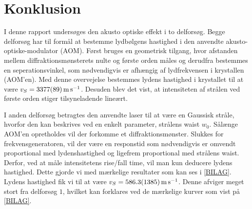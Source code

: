 \documentclass[main]{subfiles}
\begin{document}
\section{Konklusion}
I denne rapport undersøges den akusto optiske effekt i to delforsøg. Begge delforsøg har til formål at bestemme lydbølgens hastighed i den anvendte akusto-optiske-modulator (AOM). Først bruges en geometrisk tilgang, hvor afstanden mellem diffraktionsmønsterets nulte og første orden måles og derudfra bestemmes en seperationsvinkel, som nødvendigvis er afhængig af lydfrekvensen i krystallen (AOM'en). Med denne overvejelse bestemmes lydens hastighed i krystallet til at være $v_S=\SI{3377\pm89}{\meter\per\second}$.
Desuden blev det vist, at intensiteten af strålen ved første orden stiger tilsyneladende lineært.

I anden delforsøg betragtes den anvendte laser til at være en Gaussisk stråle, hvorfor den kan beskrives ved en enkelt parameter, strålens waist $w_0$. Sålænge AOM'en opretholdes vil der forkomme et diffraktionsmønster. Slukkes for frekvensgeneratoren, vil der  være en responstid som nødvendigvis er omvendt proportional med lydenshastighed og ligefrem proportional med strålens waist. Derfor, ved at måle intensitetens rise/fall time, vil man kun deducere lydens hastighed. Dette gjorde vi med mærkelige resultater som kan ses i \cref{BILAG}. Lydens hastighed fik vi til at være $v_S = \SI{586,3\pm138,5}{\meter\per\second}$. Denne afviger meget stort fra delforsøg $1$, hvilket kan forklares ved de mærkelige kurver som vist på \cref{BILAG}.
\end{document}
